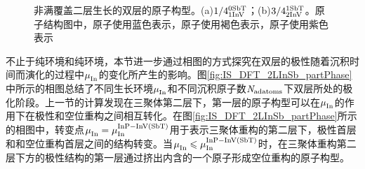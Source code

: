 \begin{figure}[htb]
{        \label{fig:IS_structure_partical_3-4_1-2}
    }
    \caption{非满覆盖二层生长的双层的原子构型。(a)$\rm 1/4{}_{1InV}^{0SbT} \it$；(b)$\rm 3/4{}_{2InV}^{1SbT} \it$。原子结构图中，原子使用蓝色表示，原子使用褐色表示，原子使用紫色表示}
    \label{fig:IS_structure_partical_2}
\end{figure}

不止于纯环境和纯环境，本节进一步通过相图的方式探究在双层的极性随着沉积时间而演化的过程中$\it \mu_{\rm In}^{\rm } \it$的变化所产生的影响。图\ref{fig:IS_DFT_2LInSb_partPhase}中所示的相图总结了不同生长环境$\it \mu_{\rm In}^{\rm } \it$和不同沉积原子数$\it N_{\rm adatoms} \it$下双层所处的极化阶段。上一节的计算发现在三聚体第二层下，第一层的原子构型可以在$\it \mu_{\rm In}^{\rm } \it$的作用下在极性和空位重构之间相互转化。在图\ref{fig:IS_DFT_2LInSb_partPhase}所示的相图中，转变点$\it \mu_{\rm In}^{\rm } \it=\it \mu_{\rm In}^{\rm InP-InV\left(SbT\right)} \it$用于表示三聚体重构的第二层下，极性首层和和空位重构首层之间的结构转变。当$\it \mu_{\rm In}^{\rm } \it \leqslant \it \mu_{\rm In}^{\rm InP-InV\left(SbT\right)} \it$时，在三聚体重构第二层下方的极性结构的第一层通过挤出内含的一个原子形成空位重构的原子构型。


